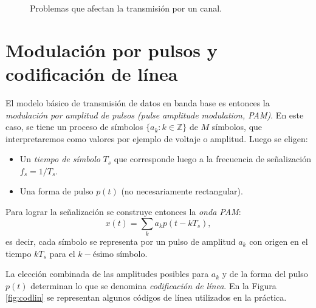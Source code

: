 \begin{figure}
\begin{center}

    \caption{Problemas que afectan la transmisión por un canal.}\label{fig:problemas canal}
    \end{center}
\end{figure}

\section{Modulación por pulsos y codificación de línea}

El modelo básico de transmisión de datos en banda base es entonces la \emph{modulación por amplitud de pulsos (pulse amplitude modulation, PAM)}. En este caso, se tiene un proceso de símbolos $\{a_k:k\in\mathbb{Z}\}$ de $M$ símbolos, que interpretaremos como valores por ejemplo de voltaje o amplitud. Luego se eligen:
\begin{itemize}
    \item Un \emph{tiempo de símbolo} $T_s$ que corresponde luego a la frecuencia de señalización $f_s=1/T_s$.
    \item Una forma de pulso $p(t)$ (no necesariamente rectangular).
\end{itemize}

Para lograr la señalización se construye entonces la \emph{onda PAM}:
\begin{equation*}
    x(t) = \sum_{k} a_k p(t-kT_s),
\end{equation*}
es decir, cada símbolo se representa por un pulso de amplitud $a_k$ con origen en el tiempo $kT_s$ para el $k-$ésimo símbolo.

La elección combinada de las amplitudes posibles para $a_k$ y de la forma del pulso $p(t)$ determinan lo que se denomina \emph{codificación de línea}. En la Figura \ref{fig:codlin} se representan algunos códigos de línea utilizados en la práctica.

